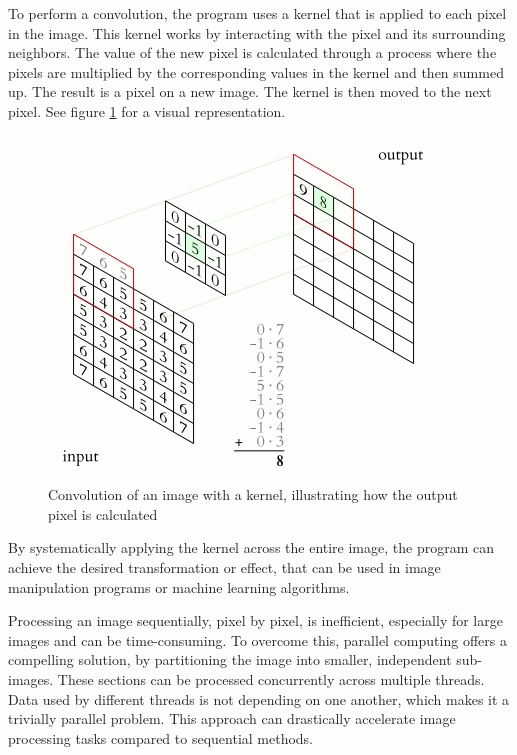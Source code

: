 \documentclass{article}
\begin{document}
\begin{multicols}{2}
    To perform a convolution, the program uses a kernel that is applied to each pixel in the image. This kernel works by interacting with the pixel and its surrounding neighbors. The value of the new pixel is calculated through a process where the pixels are multiplied by the corresponding values in the kernel and then summed up. The result is a pixel on a new image. The kernel is then moved to the next pixel. See figure \ref{fig:kernel} for a visual representation.

    \begin{figure}[H]
        \centering
        \includegraphics[width=\linewidth]{img/kernel.jpg}
        \caption{Convolution of an image with a kernel, illustrating how the output pixel is calculated \cite{plotke2013animation}}
        \label{fig:kernel}
    \end{figure}


    By systematically applying the kernel across the entire image, the program can achieve the desired transformation or effect, that can be used in image manipulation programs or machine learning algorithms.

    Processing an image sequentially, pixel by pixel, is inefficient, especially for large images and can be time-consuming. To overcome this, parallel computing offers a compelling solution, by partitioning the image into smaller, independent sub-images. These sections can be processed concurrently across multiple threads. Data used by different threads is not depending on one another, which makes it a trivially parallel problem. This approach can drastically accelerate image processing tasks compared to sequential methods.


\end{multicols}
\end{document}
